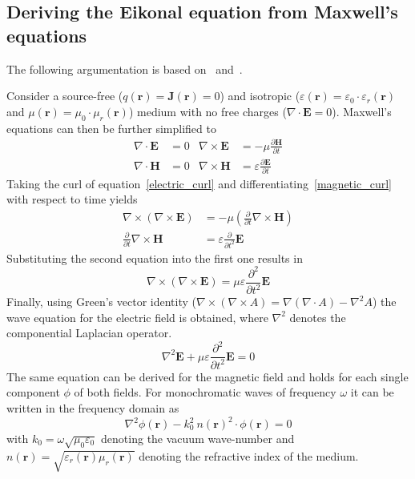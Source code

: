 \subsection{Deriving the Eikonal equation from Maxwell's equations}
The following argumentation is based on~\parencite{born_geometrische_1933} and~\parencite{sommerfeld_anwendung_1911}.

Consider a source-free (\(q(\bm{r}) = \bm{J}(\bm{r}) = 0\)) and isotropic (\(\varepsilon(\bm{r}) = \varepsilon_0 \cdot \varepsilon_r(\bm{r})\) and \(\mu(\bm{r}) = \mu_0 \cdot \mu_r(\bm{r}) \)) medium with no free charges (\(\nabla \cdot \bm{E} = 0\)).
Maxwell's equations can then be further simplified to
\begin{align}
    \nabla \cdot \bm{E} &= 0 & \nabla \times \bm{E} &= -\mu \frac{\partial \bm{H}}{\partial t}\label{electric_curl} \\
    \nabla \cdot \bm{H} &= 0 & \nabla \times \bm{H} &= \varepsilon \frac{\partial \bm{E}}{\partial t}\label{magnetic_curl}
\end{align}
Taking the curl of equation~\eqref{electric_curl} and differentiating~\eqref{magnetic_curl} with respect to time yields
\begin{align}
    \nabla \times (\nabla \times \bm{E}) &= -\mu (\frac{\partial}{\partial t} \nabla \times \bm{H}) \\
    \frac{\partial}{\partial t} \nabla \times \bm{H} &= \varepsilon \frac{\partial}{\partial t^2} \bm{E}
\end{align}
Substituting the second equation into the first one results in
\begin{equation}
    \nabla \times (\nabla \times \bm{E}) = \mu \varepsilon \frac{\partial^2}{\partial t^2} \bm{E}
\end{equation}
Finally, using Green's vector identity (\(\nabla \times (\nabla \times A) = \nabla(\nabla \cdot A) - \nabla^2 A\)) the wave equation for the electric field is obtained, where \(\nabla^2\) denotes the componential Laplacian operator.
\begin{equation}
    \nabla^2 \bm{E} + \mu \varepsilon \frac{\partial^2}{\partial t^2} \bm{E} = 0
\end{equation}
The same equation can be derived for the magnetic field and holds for each single component \(\phi \) of both fields.
For monochromatic waves of frequency \(\omega \) it can be written in the frequency domain as
\begin{equation}\label{electromagnetic_wave_equation}
    \nabla^2 \phi(\bm{r}) - k_0^2\ n{(\bm{r})}^2 \cdot \phi(\bm{r}) = 0
\end{equation}
with \(k_0 = \omega \sqrt{\mu_0 \varepsilon_0} \) denoting the vacuum wave-number and \(n(\bm{r}) = \sqrt{\varepsilon_r(\bm{r}) \mu_r(\bm{r})}\) denoting the refractive index of the medium.

